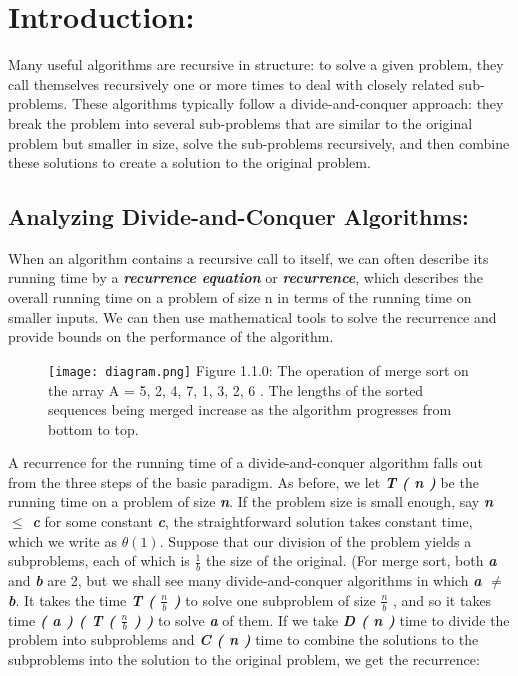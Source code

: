 \section{Introduction:}

Many useful algorithms are recursive in structure: to solve a given problem, they call themselves recursively one or more times to deal with closely related sub-problems. These algorithms typically follow a divide-and-conquer approach: they break the problem into several sub-problems that are similar to the original problem but smaller in size, solve the sub-problems recursively, and then combine these solutions to create a solution to the original problem.

\subsection{Analyzing Divide-and-Conquer Algorithms:}

When an algorithm contains a recursive call to itself, we can often describe its running time by a {\bfseries\itshape recurrence equation} or {\bfseries\itshape recurrence}, which describes the overall running time on a problem of size n in terms of the running time on smaller inputs. We can then use mathematical tools to solve the recurrence and provide bounds on the performance of the algorithm.

\begin{figure}[H]
\texttt{[image: diagram.png]}
\centering \linebreak \linebreak Figure 1.1.0: The operation of merge sort on the array A = { 5, 2, 4, 7, 1, 3, 2, 6 }. The lengths of the sorted sequences being merged increase as the algorithm progresses from bottom to top.
\end{figure}

A recurrence for the running time of a divide-and-conquer algorithm falls out from the three steps of the basic paradigm. As before, we let {\bfseries\itshape T ( n )} be the running time on a problem of size {\bfseries\itshape n}. If the problem size is small enough, say {\bfseries\itshape n $\leq$ c} for some constant {\bfseries\itshape c}, the straightforward solution takes constant time, which we write as $\theta ( 1 )$. Suppose that our division of the problem yields a subproblems, each of which is $\frac{1}{b}$ the size of the original. (For merge sort, both {\bfseries\itshape a} and {\bfseries\itshape b} are 2, but we shall see many divide-and-conquer algorithms in which {\bfseries\itshape a $\neq$ b}. It takes the time {\bfseries\itshape T ( $\frac{n}{b}$ )} to solve one subproblem of size $\frac{n}{b}$ , and so it takes time {\bfseries\itshape ( a ) ( T ( $\frac{n}{b}$ ) )} to solve {\bfseries\itshape a} of them. If we take {\bfseries\itshape D ( n )} time to divide the problem into subproblems and {\bfseries\itshape C ( n )} time to combine the solutions to the subproblems into the solution to the original problem, we get the recurrence: \hfill \break \break


